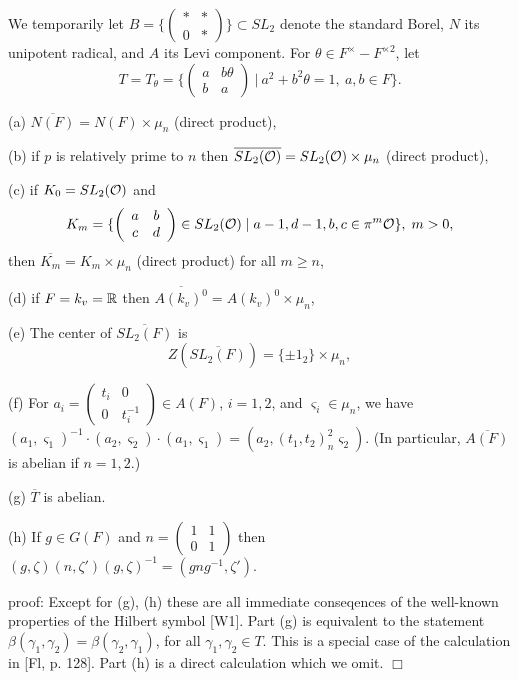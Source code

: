 We temporarily let $B=\{\left( 
\begin{array}{cc}
\ast & * \\ 
0 & *
\end{array}
\right) \}\subset SL_2$ denote the standard Borel, $N$ its unipotent
radical, and $A$ its Levi component. For
$\theta\in F^\times -F^{\times 2}$, let
\[
T=T_\theta=
\{
\left(
\begin{array}{cc}
a &b\theta \\
b & a
\end{array}
\right)
\ |\ a^2+b^2\theta =1,\ a,b\in F\}.
\]


\begin{lemma}
(a) $\overline{N(F)}=N(F)\times \mu _n$ (direct product),

(b) if $p$ is relatively prime to $n$ then 
$\overline{SL_2({\cal{O}})}=SL_2({\cal{O}})\times \mu _n$ 
(direct product),

(c) if $K_0=SL_2({\cal{O}})$ and 
\[
K_m=\{\left( 
\begin{array}{cc}
a & b \\ 
c & d
\end{array}
\right) \in SL_2({\cal{O}})\;|\;a-1,d-1,b,c\in \pi ^m{\cal{O}}\},\;m>0,
\]
then $\overline{K_m}=K_m\times \mu _n$ (direct product) for all $m\geq n$,

(d) if $F=k_v=\Bbb{R}$ then 
$\overline{A(k_v)^0}=A(k_v)^0\times \mu _n$,

(e) The center of $\overline{SL_2(F)}$ is 
\[
Z(\overline{SL_2(F)})=
\{\pm 1_2\}\times \mu _n,
\]

(f) For $a_i=\left( 
\begin{array}{cc}
t_i & 0 \\ 
0 & t_i^{-1}
\end{array}
\right) \in A(F)$, $i=1,2$, and $\varsigma _i\in \mu _n$,
we have $(a_1,\varsigma _1)^{-1}\cdot
(a_2,\varsigma _2)\cdot (a_1,\varsigma
_1)=(a_2,(t_1,t_2)_n^2\varsigma _2)$.
(In particular, $\overline{A(F)}$ is abelian if $n=1,2$.)

(g) $ \overline{T}$ is abelian.

(h) If $g\in G(F)$ and
$n=
\left(
\begin{array}{cc}
1 & 1\\
0 & 1
\end{array}
\right)
$
then $(g,\zeta)(n,\zeta ')(g,\zeta)^{-1}
=(gng^{-1},\zeta')$.
\end{lemma}

proof: Except for (g), (h)
these are all immediate conseqences of the well-known properties of
the Hilbert symbol [W1]. Part (g) is equivalent to the statement
$\beta(\gamma_1, \gamma_2)=\beta(\gamma_2, \gamma_1)$,
for all $\gamma_1, \gamma_2\in T$. This 
is a special case of the calculation in [Fl, p. 128].
Part (h) is a direct calculation which we omit. 
$\Box $

